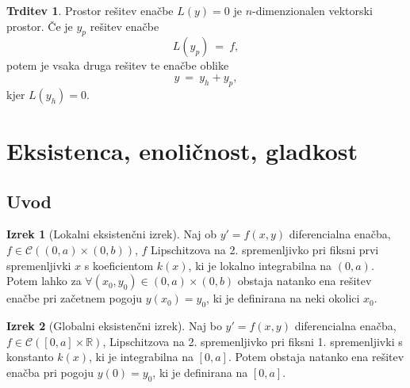 \documentclass[11pt]{article}
\newcommand{\R}{\mathbb{R}}
\newcommand{\C}{\mathcal{C}}
\newcommand{\0}{\mathbf{0}}
\theoremstyle{definition}
\theoremstyle{definition}
\newtheorem{trditev}{Trditev}[section]
\theoremstyle{definition}
\newtheorem{izrek}{Izrek}[section]
\theoremstyle{definition}
\begin{document}
\begin{trditev}

Prostor rešitev enačbe $L(y) = 0$ je $n$-dimenzionalen vektorski prostor. Če je $y_p$ rešitev enačbe
$$L(y_p) ~=~ f,$$
potem je vsaka druga rešitev te enačbe oblike
$$y ~=~ y_h + y_p,$$
kjer $L(y_h) = 0$.

\end{trditev}
\vspace{0.5cm}


\pagebreak


\section{Eksistenca, enoličnost, gladkost}
\vspace{0.5cm}


\subsection{Uvod}
\vspace{0.5cm}

\begin{izrek}[Lokalni eksistenčni izrek]

Naj ob $y' = f(x,y)$ diferencialna enačba, $f \in \C((0,a)\times(0,b))$, $f$ Lipschitzova na 2. spremenljivko pri fiksni prvi spremenljivki $x$ s koeficientom $k(x)$, ki je lokalno integrabilna na $(0,a)$. Potem lahko za $\forall (x_0,y_0) \in (0,a) \times (0,b)$ obstaja natanko ena rešitev enačbe pri začetnem pogoju $y(x_0) = y_0$, ki je definirana na neki okolici $x_0$. 

\end{izrek}
\vspace{0.5cm}

\begin{izrek}[Globalni eksistenčni izrek]

Naj bo $y' = f(x,y)$ diferencialna enačba, $f \in \C([0,a] \times \R)$, Lipschitzova na 2. spremenljivko pri fiksni 1. spremenljivki s konstanto $k(x)$, ki je integrabilna na $[0,a]$. Potem obstaja natanko ena rešitev enačba pri pogoju $y(0) = y_0$, ki je definirana na $[0,a]$.

\end{izrek}
\vspace{0.5cm}
\end{document}
